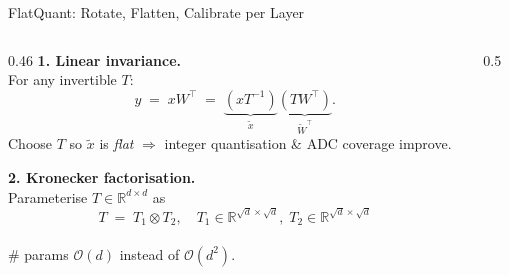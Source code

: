 \begin{frame}[shrink=10]{FlatQuant: Rotate, Flatten, Calibrate per Layer}

  \begin{columns}[T]
    \begin{column}{0.46\textwidth}
      \footnotesize
      \textbf{1. Linear invariance.}\\
      For any invertible $T$:
      \[
        y \;=\; xW^\top \;=\; \underbrace{(xT^{-1})}_{\tilde x}\underbrace{(TW^\top)}_{\tilde W^\top}.
      \]
      Choose $T$ so $\tilde x$ is \emph{flat} $\Rightarrow$ integer quantisation \& ADC coverage improve.

      \vspace{0.5em}
      \pause
      \textbf{2. Kronecker factorisation.}\\[0.2em]
      Parameterise $T \in \mathbb{R}^{d\times d}$ as
      \[
        T \;=\; T_1 \otimes T_2,\quad T_1{\in}\mathbb{R}^{\sqrt d \times \sqrt d},\; T_2{\in}\mathbb{R}^{\sqrt d \times \sqrt d}
      \]
      \vspace{-0.4em}\\
      \scriptsize \# params $\mathcal{O}(d)$ instead of $\mathcal{O}(d^2)$.
    \end{column}

    \begin{column}{0.5\textwidth}
      \footnotesize
\end{column}
\end{columns}
\end{frame}
